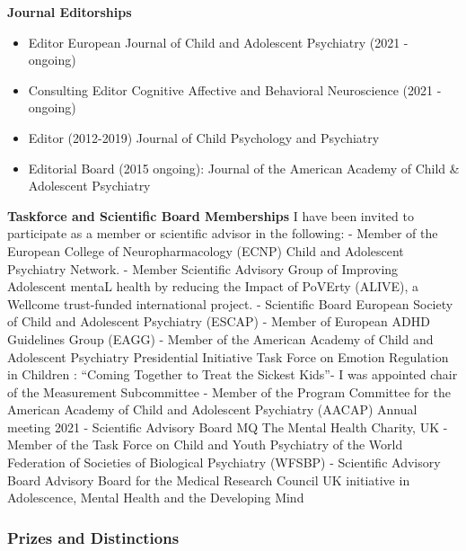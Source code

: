 \documentclass[
]{article}
\providecommand{\tightlist}{%
  \setlength{\itemsep}{0pt}\setlength{\parskip}{0pt}}
\begin{document}
\textbf{Journal Editorships}

\begin{itemize}
\tightlist
\item
  Editor European Journal of Child and Adolescent Psychiatry (2021 -
  ongoing)
\item
  Consulting Editor Cognitive Affective and Behavioral Neuroscience
  (2021 - ongoing)
\item
  Editor (2012-2019) Journal of Child Psychology and Psychiatry
\item
  Editorial Board (2015 ongoing): Journal of the American Academy of
  Child \& Adolescent Psychiatry
\end{itemize}

\textbf{Taskforce and Scientific Board Memberships} I have been invited
to participate as a member or scientific advisor in the following: -
Member of the European College of Neuropharmacology (ECNP) Child and
Adolescent Psychiatry Network. - Member Scientific Advisory Group of
Improving Adolescent mentaL health by reducing the Impact of PoVErty
(ALIVE), a Wellcome trust-funded international project. - Scientific
Board European Society of Child and Adolescent Psychiatry (ESCAP) -
Member of European ADHD Guidelines Group (EAGG) - Member of the American
Academy of Child and Adolescent Psychiatry Presidential Initiative Task
Force on Emotion Regulation in Children : ``Coming Together to Treat the
Sickest Kids''- I was appointed chair of the Measurement Subcommittee -
Member of the Program Committee for the American Academy of Child and
Adolescent Psychiatry (AACAP) Annual meeting 2021 - Scientific Advisory
Board MQ The Mental Health Charity, UK - Member of the Task Force on
Child and Youth Psychiatry of the World Federation of Societies of
Biological Psychiatry (WFSBP) - Scientific Advisory Board Advisory Board
for the Medical Research Council UK initiative in Adolescence, Mental
Health and the Developing Mind

\hypertarget{prizes-and-distinctions}{%
\subsubsection{Prizes and Distinctions}\label{prizes-and-distinctions}}
\end{document}
